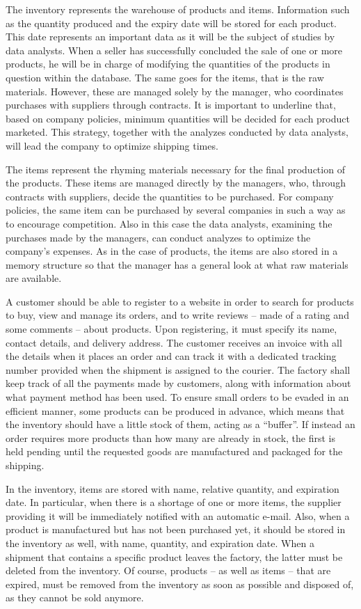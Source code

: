 The inventory represents the warehouse of products and items. Information such as the quantity produced and the expiry date will be stored for each product. This date represents an important data as it will be the subject of studies by data analysts. When a seller has successfully concluded the sale of one or more products, he will be in charge of modifying the quantities of the products in question within the database. The same goes for the items, that is the raw materials. However, these are managed solely by the manager, who coordinates purchases with suppliers through contracts. It is important to underline that, based on company policies, minimum quantities will be decided for each product marketed. This strategy, together with the analyzes conducted by data analysts, will lead the company to optimize shipping times.

The items represent the rhyming materials necessary for the final production of the products. These items are managed directly by the managers, who, through contracts with suppliers, decide the quantities to be purchased. For company policies, the same item can be purchased by several companies in such a way as to encourage competition. Also in this case the data analysts, examining the purchases made by the managers, can conduct analyzes to optimize the company's expenses. As in the case of products, the items are also stored in a memory structure so that the manager has a general look at what raw materials are available.

A customer should be able to register to a website in order to search for products to buy, view and manage its orders, and to write reviews -- made of a rating and some comments -- about products. Upon registering, it must specify its name, contact details, and delivery address. The customer receives an invoice with all the details when it places an order and can track it with a dedicated tracking number provided when the shipment is assigned to the courier. The factory shall keep track of all the payments made by customers, along with information about what payment method has been used. To ensure small orders to be evaded in an efficient manner, some products can be produced in advance, which means that the inventory should have a little stock of them, acting as a ``buffer''. If instead an order requires more products than how many are already in stock, the first is held pending until the requested goods are manufactured and packaged for
the shipping.

In the inventory, items are stored with name, relative quantity, and expiration date. In particular, when there is a shortage of one or more items, the supplier providing it will be immediately notified with an automatic e-mail. Also, when a product is manufactured but has not been purchased yet, it should be stored in
the inventory as well, with name, quantity, and expiration date. When a shipment that contains a specific product leaves the factory, the latter must be deleted from the inventory. Of course, products -- as well as items -- that are expired, must be removed from the inventory as soon as possible and disposed of, as they cannot be sold anymore.


